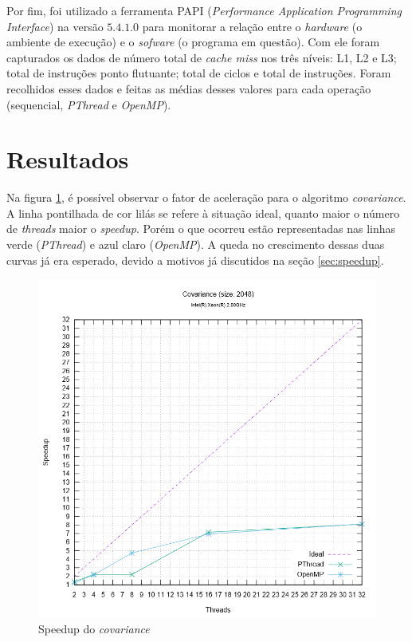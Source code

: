 \documentclass[12pt]{article}
\begin{document}
Por fim, foi utilizado a ferramenta PAPI (\textit{Performance Application Programming Interface}) na versão $5.4.1.0$ para monitorar a relação entre o \textit{hardware} (o ambiente de execução) e o \textit{sofware} (o programa em questão). Com ele foram capturados os dados de número total de \textit{cache miss} nos três níveis: L1, L2 e L3; total de instruções ponto flutuante; total de ciclos e total de instruções. Foram recolhidos esses dados e feitas as médias desses valores para cada operação (sequencial, \textit{PThread} e \textit{OpenMP}).

\section{Resultados} \label{sec:resultados}

Na figura \ref{fig:speedup}, é possível observar o fator de aceleração para o algoritmo \textit{covariance}. A linha pontilhada de cor lilás se refere à situação ideal, quanto maior o número de \textit{threads} maior o \textit{speedup}. Porém o que ocorreu estão representadas nas linhas verde (\textit{PThread}) e azul claro (\textit{OpenMP}). A queda no crescimento dessas duas curvas já era esperado, devido a motivos já discutidos na seção \ref{sec:speedup}.

\begin{figure}[ht]
	\centering
	\includegraphics[width=1\textwidth]{speedup.png}
	\caption{Speedup do \textit{covariance}}
	\label{fig:speedup}
\end{figure}
\end{document}
